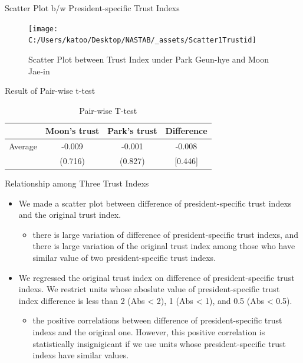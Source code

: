 \documentclass[
  ignorenonframetext,
]{beamer}
\providecommand{\tightlist}{%
  \setlength{\itemsep}{0pt}\setlength{\parskip}{0pt}}
\begin{document}
\begin{frame}{Scatter Plot b/w President-specific Trust Indexs}
\protect\hypertarget{scatter-plot-bw-president-specific-trust-indexs}{}
\begin{figure}
\texttt{[image: C:/Users/katoo/Desktop/NASTAB/\_assets/Scatter1Trustid]} \caption{Scatter Plot between Trust Index under Park Geun-hye and Moon Jae-in}\label{fig:unnamed-chunk-6}
\end{figure}
\end{frame}

\begin{frame}{Result of Pair-wise t-test}
\protect\hypertarget{result-of-pair-wise-t-test}{}
\begin{table}

\caption{\label{tab:kableTtestPresidentTrustid}Pair-wise T-test}
\centering
\begin{tabular}[t]{lccc}
\toprule
 & Moon's trust & Park's trust & Difference\\
\midrule
Average & -0.009 & -0.001 & -0.008\\
 & (0.716) & (0.827) & [0.446]\\
\bottomrule
\end{tabular}
\end{table}
\end{frame}

\begin{frame}{Relationship among Three Trust Indexs}
\protect\hypertarget{relationship-among-three-trust-indexs}{}
\begin{itemize}
\tightlist
\item
  We made a scatter plot between difference of president-specific trust indexs and the original trust index.

  \begin{itemize}
  \tightlist
  \item
    there is large variation of difference of president-specific trust indexs, and there is large variation of the original trust index among those who have similar value of two president-specific trust indexs.
  \end{itemize}
\item
  We regressed the original trust index on difference of president-specific trust indexs. We restrict units whose aboslute value of president-specific trust index difference is less than 2 (Abs \textless{} 2), 1 (Abs \textless{} 1), and 0.5 (Abs \textless{} 0.5).

  \begin{itemize}
  \tightlist
  \item
    the positive correlations between difference of president-specific trust indexs and the original one. However, this positive correlation is statistically insignigicant if we use units whose president-specific trust indexs have similar values.
  \end{itemize}
\end{itemize}
\end{frame}
\end{document}

